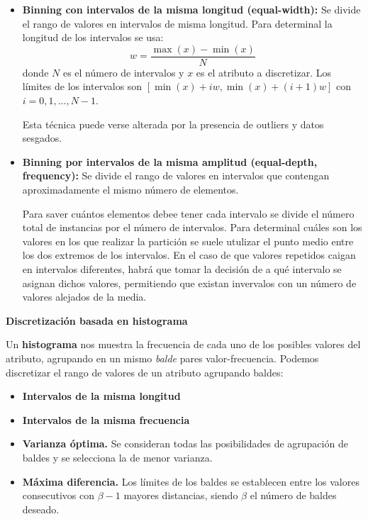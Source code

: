 \documentclass[12pt, letterpaper]{article}
\begin{document}
\begin{itemize}
    \item \textbf{Binning con intervalos de la misma longitud (equal-width):} Se divide el rango de valores en intervalos de misma longitud. Para determinal la longitud de los intervalos se usa:
    \[
        w = \frac{\max(x) - \min(x)}{N}
    \]
    donde $N$ es el número de intervalos y $x$ es el atributo a discretizar. Los límites de los intervalos son $[\min(x) + iw, \min(x) + (i+1)w]$ con $i = 0,1,\ldots,N-1$. 

    Esta técnica puede verse alterada por la presencia de outliers y datos sesgados.

    \item \textbf{Binning por intervalos de la misma amplitud (equal-depth, frequency):} Se divide el rango de valores en intervalos que contengan aproximadamente el mismo número de elementos. 
    
    Para saver cuántos elementos debee tener cada intervalo se divide el número total de instancias por el número de intervalos. Para determinal cuáles son los valores en los que realizar la partición se suele utulizar el punto medio entre los dos extremos de los intervalos. En el caso de que valores repetidos caigan en intervalos diferentes, habrá que tomar la decisión de a qué intervalo se asignan dichos valores, permitiendo que existan invervalos con un número de valores alejados de la media.
\end{itemize}

\vspace{1 em}
\textbf{Discretización basada en histograma}

Un \textbf{histograma} nos muestra la frecuencia de cada uno de los posibles valores del atributo, agrupando en un mismo \textit{balde} pares valor-frecuencia. Podemos discretizar el rango de valores de un atributo agrupando baldes:
\begin{itemize}
    \item \textbf{Intervalos de la misma longitud}
    \item \textbf{Intervalos de la misma frecuencia}
    \item \textbf{Varianza óptima.} Se consideran todas las posibilidades de agrupación de baldes y se selecciona la de menor varianza.
    \item \textbf{Máxima diferencia.} Los límites de los baldes se establecen entre los valores consecutivos con $\beta - 1$ mayores distancias, siendo $\beta$ el número de baldes deseado.
\end{itemize}
\end{document}
